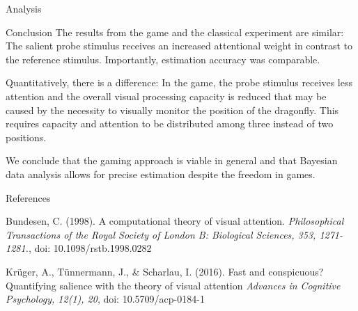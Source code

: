 \documentclass[a0paper,portrait]{baposter}
\begin{document}
\begin{poster}
\begin{posterbox}[name=results,span=1,column=2,row=0]{Analysis}
		\end{posterbox}
		
		\begin{posterbox}[name=conclusion,span=1,column=2,row=2,below=results]{Conclusion}
			The results from the game and the classical experiment are similar: The salient probe stimulus receives an increased attentional weight in contrast to the reference stimulus. Importantly, estimation accuracy was comparable.
			
			Quantitatively, there is a difference: In the game, the probe stimulus receives less attention and the overall visual processing capacity is reduced that may be caused by the necessity to visually monitor the position of the dragonfly. This requires capacity and attention to be distributed among three instead of two positions.
			
			We conclude that the gaming approach is viable in general and that Bayesian data analysis allows for precise estimation despite the freedom in games.
		\end{posterbox}
		
		\begin{posterbox}[name=refs,column=0,span=3,below=procedure,above=bottom]{References}
			\footnotesize
			\linespread{1}
			
			{\color{upbblue}Bundesen, C. } ({\color{upbblue}1998}). A computational theory of visual attention. \textit{Philosophical Transactions of the Royal Society of London B: Biological Sciences, 353, 1271-1281.}, doi: 10.1098/rstb.1998.0282 
			
			{\color{upbblue}Krüger, A., Tünnermann, J., \& Scharlau, I.} ({\color{upbblue}2016}). Fast and conspicuous? Quantifying salience with the theory of visual attention \textit{Advances in Cognitive Psychology, 12(1), 20}, doi: 10.5709/acp-0184-1 
			\vspace{0.115cm}
		\end{posterbox}
		
	\end{poster}
\end{document}
